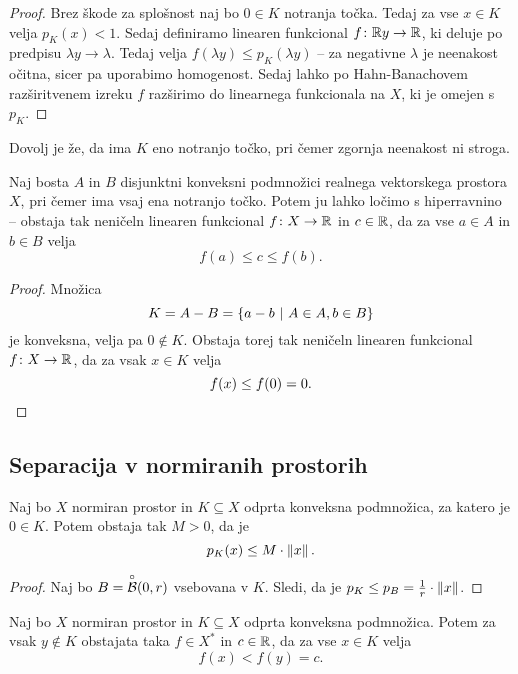 \begin{proof}
Brez škode za splošnost naj bo $0 \in K$ notranja točka. Tedaj za
vse $x \in K$ velja $p_K(x) < 1$. Sedaj definiramo linearen
funkcional $f \colon \mathbb{R} y \to \mathbb{R}$, ki deluje po predpisu
$\lambda y \to \lambda$. Tedaj velja
$f(\lambda y) \leq p_K(\lambda y)$ -- za negativne $\lambda$ je
neenakost očitna, sicer pa uporabimo homogenost. Sedaj lahko po
Hahn-Banachovem razširitvenem izreku $f$ razširimo do linearnega
funkcionala na $X$, ki je omejen s $p_K$.
\end{proof}

\begin{opomba}
Dovolj je že, da ima $K$ eno notranjo točko, pri čemer zgornja
neenakost ni stroga.
\end{opomba}

\begin{izrek}
Naj bosta $A$ in $B$ disjunktni konveksni podmnožici realnega
vektorskega prostora $X$, pri čemer ima vsaj ena notranjo točko.
Potem ju lahko ločimo s hiperravnino -- obstaja tak neničeln
linearen funkcional $f \colon X \to \mathbb{R}$ in $c \in \mathbb{R}$, da za vse
$a \in A$ in $b \in B$ velja
\[
f(a) \leq c \leq f(b).
\]
\end{izrek}

\begin{proof}
Množica
\[
K = A-B = \left\{a-b~\middle\vert~A \in A, b \in B\right\}
\]
je konveksna, velja pa $0 \not \in K$. Obstaja torej tak neničeln
linearen funkcional $f \colon X \to \mathbb{R}$, da za vsak $x \in K$ velja
\[
f(x) \leq f(0) = 0. \qedhere
\]
\end{proof}

\newpage

\subsection{Separacija v normiranih prostorih}

\begin{lema}
Naj bo $X$ normiran prostor in $K \subseteq X$ odprta konveksna
podmnožica, za katero je $0 \in K$. Potem obstaja tak $M > 0$, da
je
\[
p_K(x) \leq M \cdot \left\lVert x\right\rVert.
\]
\end{lema}

\begin{proof}
Naj bo $B = \overset{\circ}{\mathcal{B}}(0, r)$ vsebovana v $K$. Sledi, da je
$p_K \leq p_B = \frac{1}{r} \cdot \left\lVert x\right\rVert$.
\end{proof}

\begin{izrek}
Naj bo $X$ normiran prostor in $K \subseteq X$ odprta konveksna
podmnožica. Potem za vsak $y \not \in K$ obstajata taka $f \in X^*$
in $c \in \mathbb{R}$, da za vse $x \in K$ velja
\[
f(x) < f(y) = c.
\]
\end{izrek}

